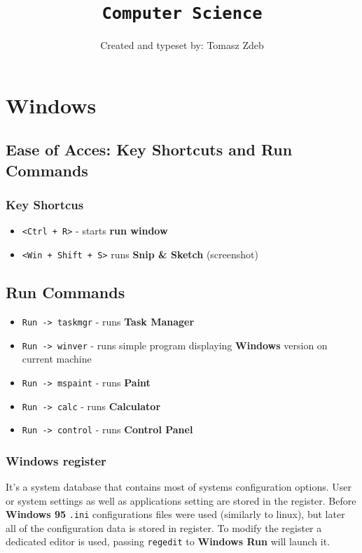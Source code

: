\documentclass[11pt,a4paper]{article}
\date{\vspace{-3em}}
\title{\vspace{-2em}\texttt{Computer Science}\vspace{-0.5em}}
\author{Created and typeset by: Tomasz Zdeb}
\newcommand{\myline}[2]{\noindent\makebox[\linewidth]{\rule{#1cm}{#2pt}}}
\newcommand{\keyshortcut}[1]{\texttt{#1}}
\begin{document}
\maketitle
\myline{16}{1}

\section{Windows}

\subsection{Ease of Acces: Key Shortcuts and Run Commands}

\subsubsection{Key Shortcus}
\begin{itemize}
\item \keyshortcut{<Ctrl + R>} - starts \textbf{run window}
\item \keyshortcut{<Win + Shift + S>} runs \textbf{Snip \& Sketch} (screenshot)
\end{itemize}

\subsection{Run Commands}
\begin{itemize}
\item \keyshortcut{Run -> taskmgr} - runs \textbf{Task Manager}
\item \keyshortcut{Run -> winver} - runs simple program displaying \textbf{Windows} version on current machine
\item \keyshortcut{Run -> mspaint} - runs \textbf{Paint}
\item \keyshortcut{Run -> calc} - runs \textbf{Calculator}
\item \keyshortcut{Run -> control} - runs \textbf{Control Panel}
\end{itemize}

\subsubsection{Windows register}
It's a system database that contains most of systems configuration options. User or system settings as well as applications setting are stored in the register. Before \textbf{Windows 95} \texttt{.ini} configurations files were used (similarly to linux), but later all of the configuration data is stored in register. To modify the register a dedicated editor is used, passing \texttt{regedit} to \textbf{Windows Run} will launch it.\\
\end{document}
